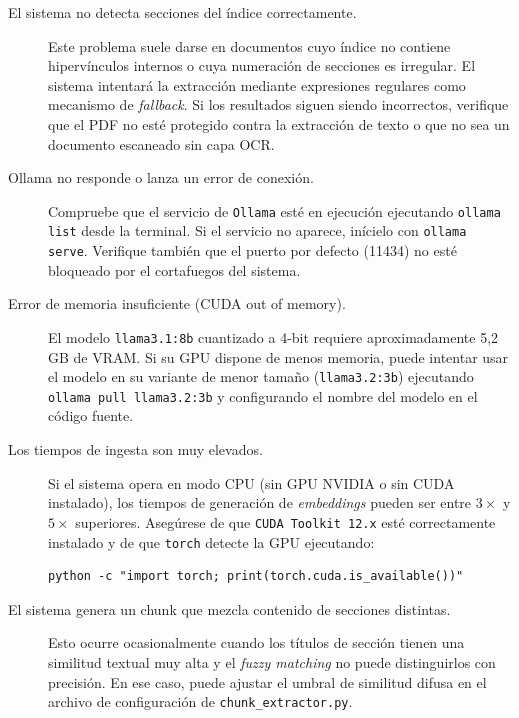 \begin{description}
    \item[El sistema no detecta secciones del índice correctamente.] Este problema suele darse en documentos cuyo índice no contiene hipervínculos internos o cuya numeración de secciones es irregular. El sistema intentará la extracción mediante expresiones regulares como mecanismo de \textit{fallback}. Si los resultados siguen siendo incorrectos, verifique que el PDF no esté protegido contra la extracción de texto o que no sea un documento escaneado sin capa OCR.

    \item[Ollama no responde o lanza un error de conexión.] Compruebe que el servicio de \texttt{Ollama} esté en ejecución ejecutando \texttt{ollama list} desde la terminal. Si el servicio no aparece, inícielo con \texttt{ollama serve}. Verifique también que el puerto por defecto (11434) no esté bloqueado por el cortafuegos del sistema.

    \item[Error de memoria insuficiente (CUDA out of memory).] El modelo \texttt{llama3.1:8b} cuantizado a 4-bit requiere aproximadamente 5,2 GB de VRAM. Si su GPU dispone de menos memoria, puede intentar usar el modelo en su variante de menor tamaño (\texttt{llama3.2:3b}) ejecutando \texttt{ollama pull llama3.2:3b} y configurando el nombre del modelo en el código fuente.

    \item[Los tiempos de ingesta son muy elevados.] Si el sistema opera en modo CPU (sin GPU NVIDIA o sin CUDA instalado), los tiempos de generación de \textit{embeddings} pueden ser entre $3\times$ y $5\times$ superiores. Asegúrese de que \texttt{CUDA Toolkit 12.x} esté correctamente instalado y de que \texttt{torch} detecte la GPU ejecutando:
\begin{verbatim}
python -c "import torch; print(torch.cuda.is_available())"
\end{verbatim}

    \item[El sistema genera un chunk que mezcla contenido de secciones distintas.] Esto ocurre ocasionalmente cuando los títulos de sección tienen una similitud textual muy alta y el \textit{fuzzy matching} no puede distinguirlos con precisión. En ese caso, puede ajustar el umbral de similitud difusa en el archivo de configuración de \texttt{chunk\_extractor.py}.
\end{description}
